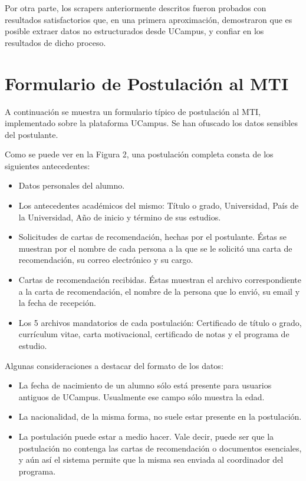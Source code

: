 Por otra parte, los scrapers anteriormente descritos fueron probados con
resultados satisfactorios que, en una primera aproximación, demostraron que es
posible extraer datos no estructurados desde UCampus, y confiar en los
resultados de dicho proceso. 

\section{Formulario de Postulación al MTI}

A continuación se muestra un formulario típico de postulación al MTI,
implementado sobre la plataforma UCampus. Se han ofuscado los datos sensibles
del postulante.


Como se puede ver en la Figura 2, una postulación completa consta de los
siguientes antecedentes:

\begin{itemize}
    \item Datos personales del alumno.
    \item Los antecedentes académicos del mismo: Título o grado, Universidad, País
    de la Universidad, Año de inicio y término de sus estudios.
    \item Solicitudes de cartas de recomendación, hechas por el postulante. Éstas se
    muestran por el nombre de cada persona a la que se le solicitó una carta de
    recomendación, su correo electrónico y su cargo.
    \item Cartas de recomendación recibidas. Éstas muestran el archivo
    correspondiente a la carta de recomendación, el nombre de la persona que lo
    envió, su email y la fecha de recepción.
    \item Los 5 archivos mandatorios de cada postulación: Certificado de título o
    grado, currículum vitae, carta motivacional, certificado de notas y el programa
    de estudio.
\end{itemize}

Algunas consideraciones a destacar del formato de los datos:

\begin{itemize}
    \item La fecha de nacimiento de un alumno sólo está presente para usuarios
    antiguos de UCampus. Usualmente ese campo sólo muestra la edad.
    \item La nacionalidad, de la misma forma, no suele estar presente en la
    postulación.
    \item La postulación puede estar a medio hacer. Vale decir, puede ser que la
    postulación no contenga las cartas de recomendación o documentos esenciales,
    y aún así el sistema permite que la misma sea enviada al coordinador del
    programa.
\end{itemize}